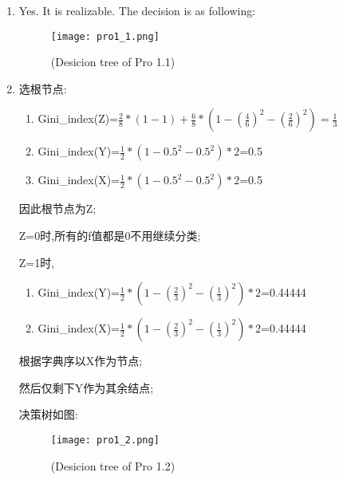 \documentclass[11pt, a4paper, UTF8]{ctexart}
\begin{document}
\begin{solution}
	\begin{enumerate}
		\item  Yes. It is realizable. The decision is as following:
		
		 \begin{figure}[htbp] 
			\centering
			\texttt{[image: pro1\_1.png]}
			\caption{(Desicion tree of Pro 1.1)}
		\end{figure} 
	\item 选根节点:
	\begin{enumerate}
		\item Gini\_index(Z)=$\frac{2}{8}*(1-1)+\frac{6}{8}*(1-(\frac{4}{6})^2-(\frac{2}{6})^2)=\frac{1}{3}$
		\item 
		Gini\_index(Y)=$\frac{1}{2}*(1-0.5^2-0.5^2)*2$=0.5
		\item Gini\_index(X)=$\frac{1}{2}*(1-0.5^2-0.5^2)*2$=0.5
	\end{enumerate}
因此根节点为Z;

Z=0时,所有的f值都是0不用继续分类;

Z=1时,
\begin{enumerate}
	\item 	Gini\_index(Y)=$\frac{1}{2}*(1-(\frac{2}{3})^2-(\frac{1}{3})^2)*2$=0.44444
		\item 	Gini\_index(X)=$\frac{1}{2}*(1-(\frac{2}{3})^2-(\frac{1}{3})^2)*2$=0.44444
\end{enumerate}
根据字典序以X作为节点;

然后仅剩下Y作为其余结点;

决策树如图:
		 \begin{figure}[htbp] 
	\centering
	\texttt{[image: pro1\_2.png]}
	\caption{(Desicion tree of Pro 1.2)}
\end{figure} 


	\end{enumerate}

    
\end{solution}
\end{document}
